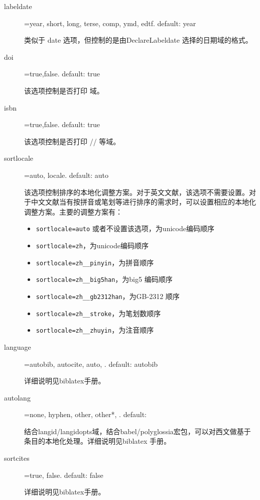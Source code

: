 \begin{description}
  \item[labeldate]=year, short, long, terse, comp, ymd, edtf. \hfill default: year

  类似于 date 选项，但控制的是由DeclareLabeldate 选择的日期域的格式。

  \item[doi]=true,false. \hfill default: true

  该选项控制是否打印  域。

  \item[isbn]=true,false. \hfill default: true

  该选项控制是否打印 \slash {}\slash {} 等域。

  \item[sortlocale]=auto, locale. \hfill default: auto

  该选项控制排序的本地化调整方案。对于英文文献，该选项不需要设置。对于中文文献当有按拼音或笔划等进行排序的需求时，可以设置相应的本地化调整方案。主要的调整方案有：
  \begin{itemize}
    \item \verb|sortlocale=auto| 或者不设置该选项，为unicode编码顺序
    \item \verb|sortlocale=zh|，为unicode编码顺序
    \item \verb|sortlocale=zh__pinyin|，为拼音顺序
    \item \verb|sortlocale=zh__big5han|，为big5 编码顺序
    \item \verb|sortlocale=zh__gb2312han|，为GB-2312 顺序
    \item \verb|sortlocale=zh__stroke|，为笔划数顺序
    \item \verb|sortlocale=zh__zhuyin|，为注音顺序
  \end{itemize}

  \item[language]=autobib, autocite, auto, . \hfill default: autobib

  详细说明见biblatex手册。

  \item[autolang]=none, hyphen, other, other*, . \hfill default:

  结合langid/langidopts域，结合babel/polyglossia宏包，可以对西文做基于条目的本地化处理。详细说明见biblatex 手册。

  \item[sortcites]=true, false. \hfill default: false

  详细说明见biblatex手册。


\end{description}
